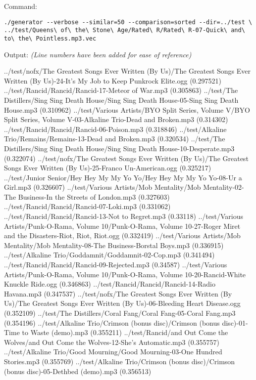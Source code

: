 Command:
\begin{verbatim}
./generator --verbose --similar=50 --comparison=sorted --dir=../test \
../test/Queens\ of\ the\ Stone\ Age/Rated\ R/Rated\ R-07-Quick\ and\ to\ the\ Pointless.mp3.vec
\end{verbatim}
Output: \small \emph{(Line numbers have been added for ease of reference)}
\begin{listing}{1}
../test/nofx/The Greatest Songs Ever Written (By Us)/The Greatest Songs Ever Written (By Us)-24-It's My Job to Keep Punkrock Elite.ogg (0.297521)
../test/Rancid/Rancid/Rancid-17-Meteor of War.mp3 (0.305863)
../test/The Distillers/Sing Sing Death House/Sing Sing Death House-05-Sing Sing Death House.mp3 (0.310962)
../test/Various Artists/BYO Split Series, Volume V/BYO Split Series, Volume V-03-Alkaline Trio-Dead and Broken.mp3 (0.314302)
../test/Rancid/Rancid/Rancid-06-Poison.mp3 (0.318846)
../test/Alkaline Trio/Remains/Remains-13-Dead and Broken.mp3 (0.320534)
../test/The Distillers/Sing Sing Death House/Sing Sing Death House-10-Desperate.mp3 (0.322074)
../test/nofx/The Greatest Songs Ever Written (By Us)/The Greatest Songs Ever Written (By Us)-25-Franco Un-American.ogg (0.325217)
../test/Junior Senior/Hey Hey My My Yo Yo/Hey Hey My My Yo Yo-08-Ur a Girl.mp3 (0.326607)
../test/Various Artists/Mob Mentality/Mob Mentality-02-The Business-In the Streets of London.mp3 (0.327603)
../test/Rancid/Rancid/Rancid-07-Loki.mp3 (0.331062)
../test/Rancid/Rancid/Rancid-13-Not to Regret.mp3 (0.33118)
../test/Various Artists/Punk-O-Rama, Volume 10/Punk-O-Rama, Volume 10-27-Roger Miret and the Disasters-Riot, Riot, Riot.ogg (0.332419)
../test/Various Artists/Mob Mentality/Mob Mentality-08-The Business-Borstal Boys.mp3 (0.336915)
../test/Alkaline Trio/Goddamnit/Goddamnit-02-Cop.mp3 (0.341494)
../test/Rancid/Rancid/Rancid-09-Rejected.mp3 (0.34587)
../test/Various Artists/Punk-O-Rama, Volume 10/Punk-O-Rama, Volume 10-20-Rancid-White Knuckle Ride.ogg (0.346863)
../test/Rancid/Rancid/Rancid-14-Radio Havana.mp3 (0.347537)
../test/nofx/The Greatest Songs Ever Written (By Us)/The Greatest Songs Ever Written (By Us)-06-Bleeding Heart Disease.ogg (0.352109)
../test/The Distillers/Coral Fang/Coral Fang-05-Coral Fang.mp3 (0.354196)
../test/Alkaline Trio/Crimson (bonus disc)/Crimson (bonus disc)-01-Time to Waste (demo).mp3 (0.355211)
../test/Rancid/and Out Come the Wolves/and Out Come the Wolves-12-She's Automatic.mp3 (0.355757)
../test/Alkaline Trio/Good Mourning/Good Mourning-03-One Hundred Stories.mp3 (0.355769)
../test/Alkaline Trio/Crimson (bonus disc)/Crimson (bonus disc)-05-Dethbed (demo).mp3 (0.356513)

\end{listing}
